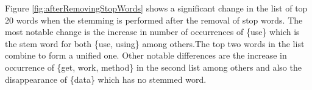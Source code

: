 \documentclass{sig-alternate-05-2015}
\begin{document}
Figure \ref{fig:afterRemovingStopWords} shows a significant change in the list of top 20 words when the stemming is performed after the removal of stop words. The most notable change is the increase in number of occurrences of \{use\} which is the stem word for both \{use, using\} among others.The top two words in the list combine to form a unified one. Other notable differences are the increase in occurrence of \{get, work, method\} in the second list among others and also the disappearance of \{data\} which has no stemmed word.
\begin{figure}
\centering
  \centering

\end{figure}
\end{document}

